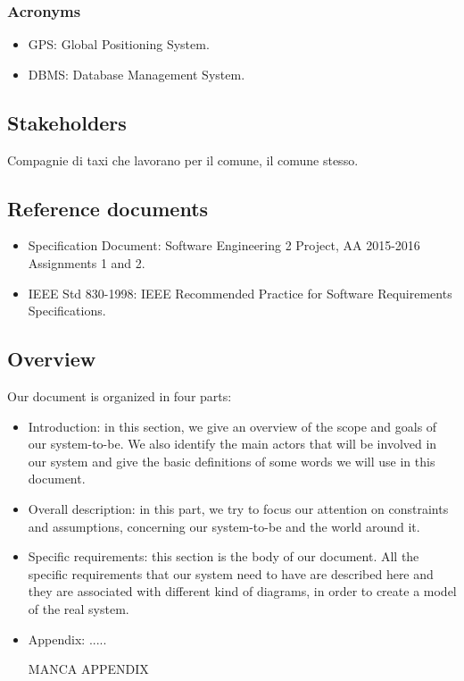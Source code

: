 \documentclass{article}
\begin{document}
    \subsubsection{Acronyms}
        \begin{itemize}
            \item GPS: Global Positioning System.
            \item DBMS: Database Management System.
        \end{itemize}
    
    \subsection{Stakeholders}
        Compagnie di taxi che lavorano per il comune, il comune stesso.
    
	\subsection{Reference documents}
	    \begin{itemize}
	        \item Specification Document: Software Engineering 2 Project, AA 2015-2016 Assignments 1 and 2.
	        \item IEEE Std 830-1998: IEEE Recommended Practice for Software Requirements Specifications.
	    \end{itemize}

	
	\subsection{Overview}
	    Our document is organized in four parts:
	    \begin{itemize}
    	    \item Introduction: in this section, we give an overview of the scope and goals of our system-to-be. We also identify the main actors that will be involved in our system and give the basic definitions of some words we will use in this document.
    	    \item Overall description: in this part, we try to focus our attention on constraints and assumptions, concerning our system-to-be and the world around it. 
    	    \item Specific requirements: this section is the body of our document. All the specific requirements that our system need to have are described here and they are associated with different kind of diagrams, in order to create a model of the real system.
    	    \item Appendix: .....
    	    
    	    MANCA APPENDIX
    	    
	    \end{itemize}
	
\end{document}

